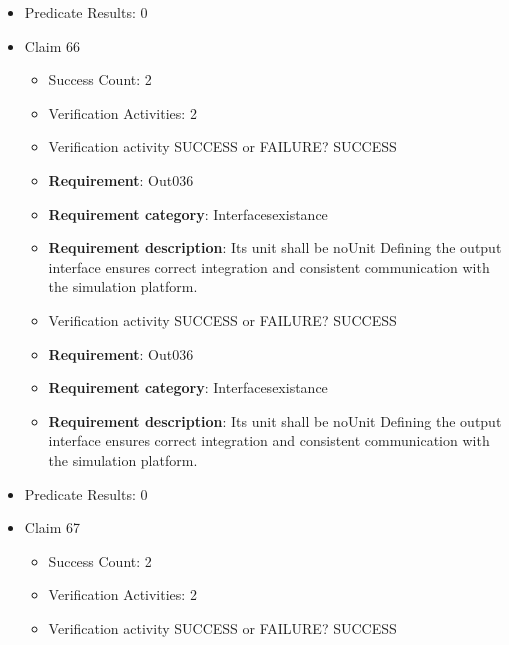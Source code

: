 \documentclass{article}
\begin{document}
\begin{itemize}
\begin{itemize}
					\item Verification activity SUCCESS or FAILURE? SUCCESS
		
						\item \textbf{Requirement}: Out035 
						\item \textbf{Requirement category}: Interfacesexistance 
						\item \textbf{Requirement description}: Its unit shall be noUnit Defining the output interface ensures correct integration and consistent communication with the simulation platform.
					
				\end{itemize}
				
									    
				\item Predicate Results: 0

  				  \item Claim 66
				\begin{itemize}
			    	\item Success Count: 2 
			    	\item Verification Activities: 2
					\item Verification activity SUCCESS or FAILURE? SUCCESS
		
						\item \textbf{Requirement}: Out036 
						\item \textbf{Requirement category}: Interfacesexistance 
						\item \textbf{Requirement description}: Its unit shall be noUnit Defining the output interface ensures correct integration and consistent communication with the simulation platform.
					
					\item Verification activity SUCCESS or FAILURE? SUCCESS
		
						\item \textbf{Requirement}: Out036 
						\item \textbf{Requirement category}: Interfacesexistance 
						\item \textbf{Requirement description}: Its unit shall be noUnit Defining the output interface ensures correct integration and consistent communication with the simulation platform.
					
				\end{itemize}
				
									    
				\item Predicate Results: 0

  				  \item Claim 67
				\begin{itemize}
			    	\item Success Count: 2 
			    	\item Verification Activities: 2
					\item Verification activity SUCCESS or FAILURE? SUCCESS
		

\end{itemize}
\end{itemize}
\end{document}
